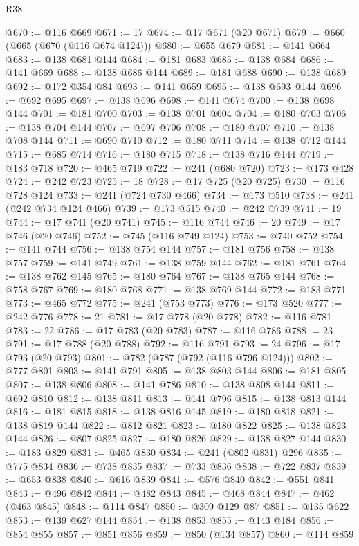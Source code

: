 \begin{lexlean}{R38}
\begin{coremodule}
@670 := @116 @669
@671 := 17
@674 := @17 @671 (@20 @671)
@679 := @660 (@665 (@670 (@116 @674 @124)))
@680 := @655 @679
@681 := @141 @664
@683 := @138 @681 @144
@684 := @181 @683
@685 := @138 @684
@686 := @141 @669
@688 := @138 @686 @144
@689 := @181 @688
@690 := @138 @689
@692 := @172 @354 @84
@693 := @141 @659
@695 := @138 @693 @144
@696 := @692 @695
@697 := @138 @696
@698 := @141 @674
@700 := @138 @698 @144
@701 := @181 @700
@703 := @138 @701 @604
@704 := @180 @703
@706 := @138 @704 @144
@707 := @697 @706
@708 := @180 @707
@710 := @138 @708 @144
@711 := @690 @710
@712 := @180 @711
@714 := @138 @712 @144
@715 := @685 @714
@716 := @180 @715
@718 := @138 @716 @144
@719 := @183 @718
@720 := @465 @719
@722 := @241 (@680 @720)
@723 := @173 @428
@724 := @242 @723
@725 := 18
@728 := @17 @725 (@20 @725)
@730 := @116 @728 @124
@733 := @241 (@724 @730 @466)
@734 := @173 @510
@738 := @241 (@242 @734 @124 @466)
@739 := @173 @515
@740 := @242 @739
@741 := 19
@744 := @17 @741 (@20 @741)
@745 := @116 @744
@746 := 20
@749 := @17 @746 (@20 @746)
@752 := @745 (@116 @749 @124)
@753 := @740 @752
@754 := @141 @744
@756 := @138 @754 @144
@757 := @181 @756
@758 := @138 @757
@759 := @141 @749
@761 := @138 @759 @144
@762 := @181 @761
@764 := @138 @762 @145
@765 := @180 @764
@767 := @138 @765 @144
@768 := @758 @767
@769 := @180 @768
@771 := @138 @769 @144
@772 := @183 @771
@773 := @465 @772
@775 := @241 (@753 @773)
@776 := @173 @520
@777 := @242 @776
@778 := 21
@781 := @17 @778 (@20 @778)
@782 := @116 @781
@783 := 22
@786 := @17 @783 (@20 @783)
@787 := @116 @786
@788 := 23
@791 := @17 @788 (@20 @788)
@792 := @116 @791
@793 := 24
@796 := @17 @793 (@20 @793)
@801 := @782 (@787 (@792 (@116 @796 @124)))
@802 := @777 @801
@803 := @141 @791
@805 := @138 @803 @144
@806 := @181 @805
@807 := @138 @806
@808 := @141 @786
@810 := @138 @808 @144
@811 := @692 @810
@812 := @138 @811
@813 := @141 @796
@815 := @138 @813 @144
@816 := @181 @815
@818 := @138 @816 @145
@819 := @180 @818
@821 := @138 @819 @144
@822 := @812 @821
@823 := @180 @822
@825 := @138 @823 @144
@826 := @807 @825
@827 := @180 @826
@829 := @138 @827 @144
@830 := @183 @829
@831 := @465 @830
@834 := @241 (@802 @831) @296
@835 := @775 @834
@836 := @738 @835
@837 := @733 @836
@838 := @722 @837
@839 := @653 @838
@840 := @616 @839
@841 := @576 @840
@842 := @551 @841
@843 := @496 @842
@844 := @482 @843
@845 := @468 @844
@847 := @462 (@463 @845)
@848 := @114 @847
@850 := @309 @129 @87
@851 := @135 @622
@853 := @139 @627 @144
@854 := @138 @853
@855 := @143 @184
@856 := @854 @855
@857 := @851 @856
@859 := @850 (@134 @857)
@860 := @114 @859

\end{coremodule}
\end{lexlean}
